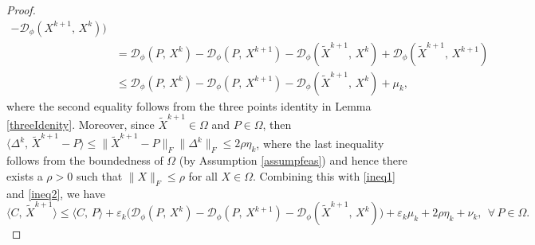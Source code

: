 \documentclass[10pt]{article}
\begin{document}
\begin{proof}
\begin{equation}
\begin{aligned}
-\mathcal{D}_{\phi}(X^{k+1},\,X^k) \big) \\
&=\mathcal{D}_{\phi}(P,\,X^k)-\mathcal{D}_{\phi}(P,\,X^{k+1}) -\mathcal{D}_{\phi}(\widetilde{X}^{k+1},\,X^k)
+\mathcal{D}_{\phi}(\widetilde{X}^{k+1},\,X^{k+1}) \\
&\leq \mathcal{D}_{\phi}(P,\,X^k)
-\mathcal{D}_{\phi}(P,\,X^{k+1})
-\mathcal{D}_{\phi}(\widetilde{X}^{k+1},\,X^k) + \mu_k,
\end{aligned}
\end{equation}
where the second equality follows from the three points identity in Lemma \ref{threeIdenity}. Moreover, since $\widetilde{X}^{k+1}\in\Omega$ and $P\in\Omega$, then $\langle \Delta^{k}, \,\widetilde{X}^{k+1}-P \rangle\leq\|\widetilde{X}^{k+1}-P\|_F\|\Delta^{k}\|_F\leq2\rho\eta_k$, where the last inequality follows from the boundedness of $\Omega$ (by Assumption \ref{assumpfeas}) and hence there exists a $\rho>0$ such that $\|X\|_F\leq\rho$ for all $X\in\Omega$. Combining this with \eqref{ineq1} and \eqref{ineq2}, we have
\begin{equation}\label{desineq-U}
\langle C, \,\widetilde{X}^{k+1}\rangle \leq \langle C, \,P\rangle + \varepsilon_k\big( \mathcal{D}_{\phi}(P,\,X^k)
-\mathcal{D}_{\phi}(P,\,X^{k+1})
-\mathcal{D}_{\phi}(\widetilde{X}^{k+1},\,X^k)\big) + \varepsilon_k\mu_k + 2\rho\eta_k + \nu_k, ~~ \forall\,P\in\Omega.
\end{equation}


\end{proof}
\end{document}
